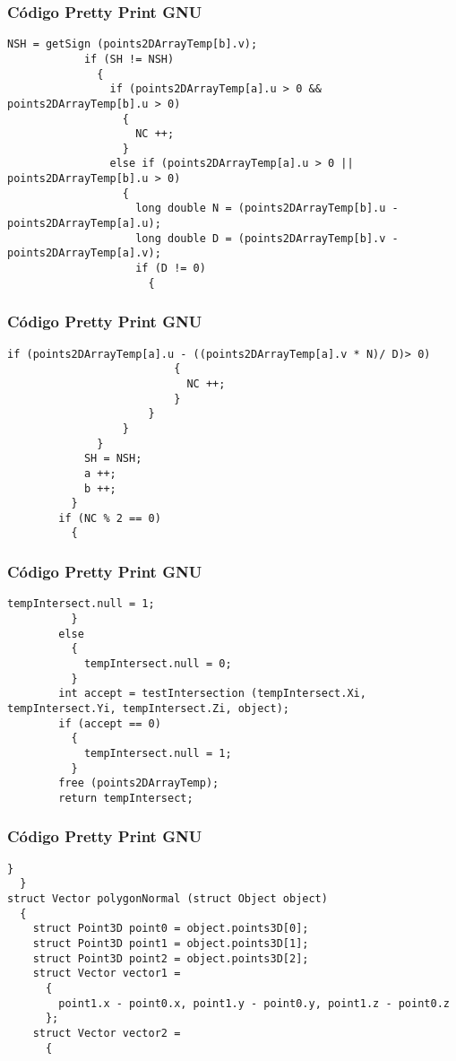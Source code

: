 \documentclass{beamer}
\begin{document}
\begin{frame}[fragile]
\frametitle{C\'odigo Pretty Print GNU}
\begin{lstlisting}[style=CStyle]
            NSH = getSign (points2DArrayTemp[b].v);
            if (SH != NSH)
              {
                if (points2DArrayTemp[a].u > 0 && points2DArrayTemp[b].u > 0)
                  {
                    NC ++;
                  }
                else if (points2DArrayTemp[a].u > 0 || points2DArrayTemp[b].u > 0)
                  {
                    long double N = (points2DArrayTemp[b].u - points2DArrayTemp[a].u);
                    long double D = (points2DArrayTemp[b].v - points2DArrayTemp[a].v);
                    if (D != 0)
                      {
                        \end{lstlisting}
\end{frame}
\begin{frame}[fragile]
\frametitle{C\'odigo Pretty Print GNU}
\begin{lstlisting}[style=CStyle]
                        if (points2DArrayTemp[a].u - ((points2DArrayTemp[a].v * N)/ D)> 0)
                          {
                            NC ++;
                          }
                      }
                  }
              }
            SH = NSH;
            a ++;
            b ++;
          }
        if (NC % 2 == 0)
          {
            \end{lstlisting}
\end{frame}
\begin{frame}[fragile]
\frametitle{C\'odigo Pretty Print GNU}
\begin{lstlisting}[style=CStyle]
            tempIntersect.null = 1;
          }
        else
          {
            tempIntersect.null = 0;
          }
        int accept = testIntersection (tempIntersect.Xi, tempIntersect.Yi, tempIntersect.Zi, object);
        if (accept == 0)
          {
            tempIntersect.null = 1;
          }
        free (points2DArrayTemp);
        return tempIntersect;
\end{lstlisting}
\end{frame}
\begin{frame}[fragile]
\frametitle{C\'odigo Pretty Print GNU}
\begin{lstlisting}[style=CStyle]
      }
  }
struct Vector polygonNormal (struct Object object)
  {
    struct Point3D point0 = object.points3D[0];
    struct Point3D point1 = object.points3D[1];
    struct Point3D point2 = object.points3D[2];
    struct Vector vector1 =
      {
        point1.x - point0.x, point1.y - point0.y, point1.z - point0.z
      };
    struct Vector vector2 =
      {
        \end{lstlisting}
\end{frame}
\end{document}
